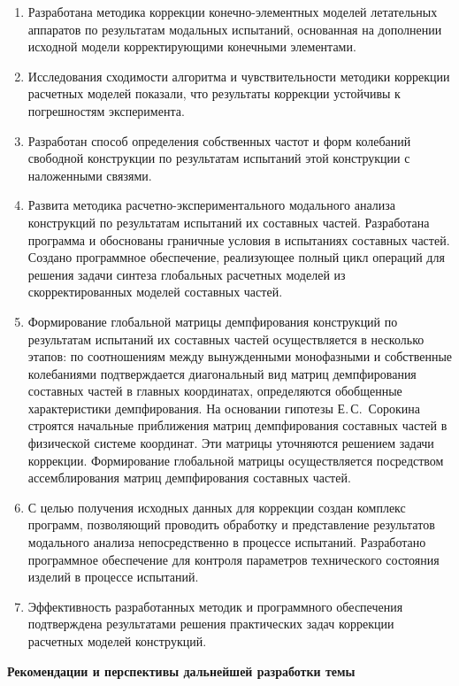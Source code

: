 
\begin{enumerate}
	\item Разработана методика коррекции конечно-элементных моделей летательных аппаратов по результатам модальных испытаний, основанная на дополнении исходной модели корректирующими конечными элементами.
	\item Исследования сходимости алгоритма и чувствительности методики коррекции расчетных моделей показали, что результаты коррекции устойчивы к погрешностям эксперимента. 
	\item Разработан способ определения собственных частот и форм колебаний свободной конструкции по результатам испытаний этой конструкции с наложенными связями.
	\item Развита методика расчетно-экспериментального модального анализа конструкций по результатам испытаний их составных частей. Разработана программа и обоснованы граничные условия в испытаниях составных частей. Создано программное обеспечение, реализующее полный цикл операций для решения задачи синтеза глобальных расчетных моделей из скорректированных моделей составных частей.
	\item Формирование глобальной матрицы демпфирования конструкций по результатам испытаний их составных частей осуществляется в несколько этапов: по соотношениям между вынужденными монофазными и собственные колебаниями подтверждается диагональный вид матриц демпфирования составных частей в главных координатах, определяются обобщенные характеристики демпфирования. На основании гипотезы Е.\,С.~Сорокина строятся начальные приближения матриц демпфирования составных частей в физической системе координат. Эти матрицы уточняются решением задачи коррекции. Формирование глобальной матрицы осуществляется посредством ассемблирования матриц демпфирования составных частей. 
	\item С целью получения исходных данных для коррекции создан комплекс программ, позволяющий проводить обработку и представление результатов модального анализа непосредственно в процессе испытаний. Разработано программное обеспечение для контроля параметров технического состояния изделий в процессе испытаний.
	\item Эффективность разработанных методик и программного обеспечения подтверждена результатами решения практических задач коррекции расчетных моделей конструкций.
\end{enumerate}

\textbf{Рекомендации и перспективы дальнейшей разработки темы}


